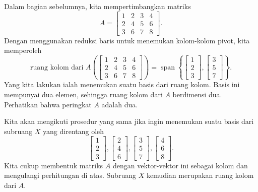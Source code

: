 \begin{example}
Dalam bagian sebelumnya, kita mempertimbangkan matriks
\begin{equation*}
A =
\begin{bmatrix}
1 & 2 & 3 & 4 \\
2 & 4 & 5 & 6 \\
3 & 6 & 7 & 8
\end{bmatrix} .
\end{equation*}
Dengan menggunakan reduksi baris untuk menemukan kolom-kolom pivot, kita memperoleh
\begin{equation*}
\text{ruang kolom dari $A$} \left(
\begin{bmatrix}
1 & 2 & 3 & 4 \\
2 & 4 & 5 & 6 \\
3 & 6 & 7 & 8
\end{bmatrix}
\right)
=
\operatorname{span}
\left\{
\begin{bmatrix}
1 \\
2 \\
3
\end{bmatrix}
,
\begin{bmatrix}
3 \\
5 \\
7
\end{bmatrix}
\right\} .
\end{equation*}
Yang kita lakukan ialah menemukan suatu basis dari ruang kolom.
Basis ini mempunyai dua elemen, sehingga ruang kolom dari $A$ berdimensi dua.
Perhatikan bahwa peringkat $A$ adalah dua.
\end{example}

Kita akan mengikuti prosedur yang sama jika ingin menemukan suatu basis dari
subruang $X$ yang direntang oleh
\begin{equation*}
\begin{bmatrix}
1 \\
2 \\
3
\end{bmatrix}
,
\begin{bmatrix}
2 \\
4 \\
6
\end{bmatrix}
,
\begin{bmatrix}
3 \\
5 \\
7
\end{bmatrix}
,
\begin{bmatrix}
4 \\
6 \\
8
\end{bmatrix}
.
\end{equation*}
Kita cukup membentuk matriks $A$ dengan vektor-vektor ini sebagai kolom
dan mengulangi perhitungan di atas. Subruang $X$ kemudian merupakan ruang kolom dari
$A$.

